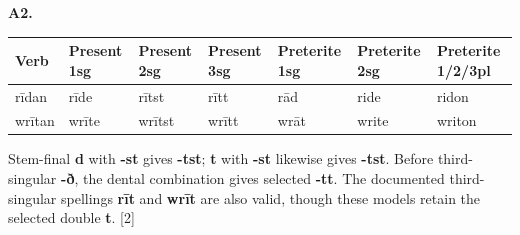 \par\begin{minipage}{\linewidth}\raggedright
\textbf{A2.}

\par\begingroup
\fontsize{10.5}{13.2}\selectfont
\setlength{\LTleft}{0pt}\setlength{\LTright}{\fill}
\noindent
\begin{tabular}{@{}>{\raggedright\arraybackslash}p{14.44mm}>{\raggedright\arraybackslash}p{14.44mm}>{\raggedright\arraybackslash}p{14.44mm}>{\raggedright\arraybackslash}p{14.44mm}>{\raggedright\arraybackslash}p{15.59mm}>{\raggedright\arraybackslash}p{15.59mm}>{\raggedright\arraybackslash}p{18.19mm}@{}}
\toprule
\textbf{Verb} & \textbf{Present 1sg} & \textbf{Present 2sg} & \textbf{Present 3sg} & \textbf{Preterite 1sg} & \textbf{Preterite 2sg} & \textbf{Preterite 1/\allowbreak{}2/\allowbreak{}3pl} \\
\midrule
rīdan & rīde & rītst & rītt & rād & ride & ridon \\
wrītan & wrīte & wrītst & wrītt & wrāt & write & writon \\
\bottomrule
\end{tabular}
\par\endgroup

Stem-final \textbf{d} with \textbf{-st} gives \textbf{-tst}; \textbf{t} with \textbf{-st} likewise gives \textbf{-tst}. Before third-singular \textbf{-ð}, the dental combination gives selected \textbf{-tt}. The documented third-singular spellings \textbf{rīt} and \textbf{wrīt} are also valid, though these models retain the selected double \textbf{t}. [2]

\end{minipage}\par\addvspace{4pt}

